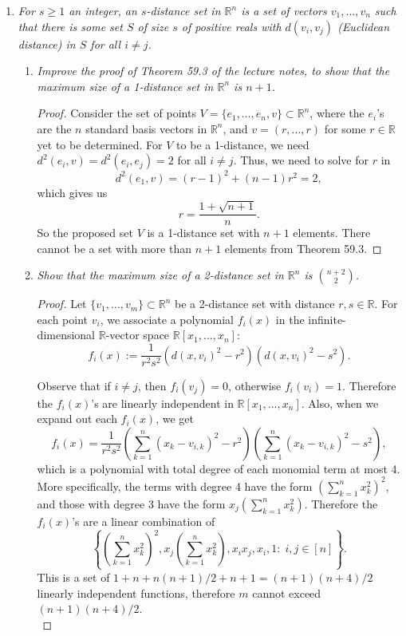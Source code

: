 \documentclass{article}
\begin{document}
\begin{enumerate}
  \item \it For $s\geq1$ an integer, an $s$-distance set in $\mathbb{R}^n$
    is a set of vectors $v_1,\ldots,v_n$ such that there is some set $S$ of
    size $s$ of positive reals with $d(v_i,v_j)$ (Euclidean distance) in
    $S$ for all $i\neq j$.

    \begin{enumerate}
      \item \it Improve the proof of Theorem 59.3 of the lecture notes, to
        show that the maximum size of a 1-distance set in $\mathbb{R}^n$ is
        $n+1$.

        \begin{proof}
          Consider the set of points $V=\{e_1,\ldots,e_n,v\}
          \subset\mathbb{R}^n$, where the $e_i$'s are the $n$ standard
          basis vectors in $\mathbb{R}^n$, and $v=(r,\ldots,r)$ for
          some $r\in\mathbb{R}$ yet to be determined. For $V$ to be a
          1-distance, we need $d^2(e_i,v)=d^2(e_i,e_j)=2$ for all $i\neq
          j$. Thus, we need to solve for $r$ in
          \[d^2(e_1,v) =(r-1)^2 +(n-1)r^2=2,\]
          which gives us
          \[r =\frac{1+\sqrt{n+1}}{n}.\]
          So the proposed set $V$ is a 1-distance set with $n+1$ elements.
          There cannot be a set with more than $n+1$ elements from Theorem
          59.3.
        \end{proof}

      \item \it Show that the maximum size of a 2-distance set in
        $\mathbb{R}^n$ is $\binom{n+2}{2}$.

        \begin{proof}
          Let $\{v_1,\ldots,v_m\} \subset\mathbb{R}^n$ be a 2-distance set
          with distance $r,s\in\mathbb{R}$. For each point $v_i$, we
          associate a polynomial $f_i(x)$ in the infinite-dimensional
          $\mathbb{R}$-vector space $\mathbb{R}[x_1,\ldots,x_n]$:
          \[f_i(x) :=\frac{1}{r^2s^2} (d(x,v_i)^2-r^2)(d(x,v_i)^2-s^2).\]

          Observe that if $i\neq j$, then $f_i(v_j)=0$, otherwise
          $f_i(v_i)=1$. Therefore the $f_i(x)$'s are linearly
          independent in $\mathbb{R}[x_1,\ldots,x_n]$. Also, when we expand
          out each $f_i(x)$, we get
          \[f_i(x) =\frac{1}{r^2s^2} \left(\sum_{k=1}^n (x_k-v_{i,k})^2
          -r^2\right) \left(\sum_{k=1}^n (x_k-v_{i,k})^2 -s^2\right),\]
          which is a polynomial with total degree of each monomial term at
          most 4. More specifically, the terms with degree 4 have the form
          $\left(\sum_{k=1}^n x_k^2\right)^2$, and those with degree 3 have
          the form $x_j\left(\sum_{k=1}^n x_k^2\right)$. Therefore the
          $f_i(x)$'s are a linear combination of
          \[\left\{\left(\sum_{k=1}^n x_k^2\right)^2, x_j\left(\sum_{k=1}^n
          x_k^2\right), x_ix_j, x_i, 1:\; i,j\in[n] \right\}.\]
          This is a set of $1+n+n(n+1)/2+n+1 =(n+1)(n+4)/2$ linearly
          independent functions, therefore $m$ cannot exceed
          $(n+1)(n+4)/2$. \\


\end{proof}
\end{enumerate}
\end{enumerate}
\end{document}
